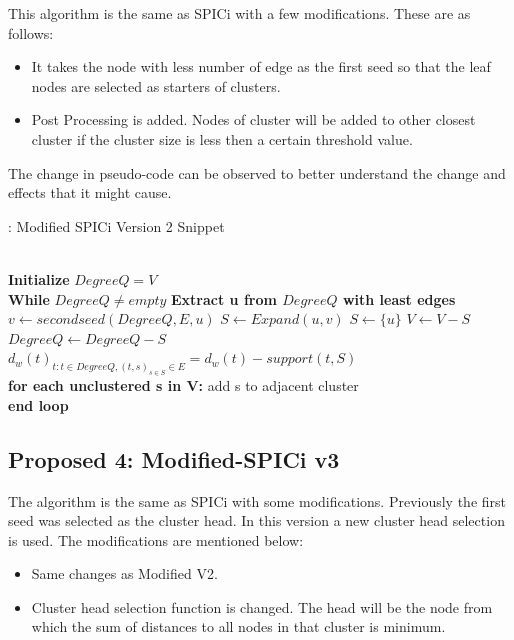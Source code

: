 \documentclass[8pt]{extarticle}
\begin{document}
	This algorithm is the same as SPICi with a few modifications. These are as follows:
	\begin{itemize}
		\item It takes the node with less number of edge as the first seed so that the leaf nodes are selected as starters of clusters.
		\item Post Processing is added. Nodes of cluster will be added to other closest cluster if the cluster size is less then a certain threshold value.
	\end{itemize}
	The change in pseudo-code can be observed to better understand the change and effects that it might cause.
	\begin{algorithm}
		\caption{: Modified SPICi Version 2 Snippet}\label{euclid}
		\begin{algorithmic}[1]
			 \\
			\textbf{Initialize} $DegreeQ = V$ \\
			\textbf{While} $DegreeQ \neq empty$
			\State \textbf{Extract u from $DegreeQ$ with least edges}
			\State $v \gets secondseed(DegreeQ,E,u)$
			 $S \gets Expand(u,v)$
			\EndIf
			\Else 
			\State $S \gets \{u\}$
			\EndIf
			\State $V \gets V - S $
			\State $Degree Q \gets Degree Q - S$
			\State $d_w(t)_{t:t\in DegreeQ,(t,s)_{s\in S}\in E} = d_w(t) - support(t,S)$
			\EndProcedure
			\\
				\textbf{for each unclustered s in V:}
					\State add s to adjacent cluster
					\EndIf \\
				\textbf{end loop}
			\EndProcedure
		\end{algorithmic}
	\end{algorithm}
	\subsection{Proposed 4: Modified-SPICi v3}
	
	The algorithm is the same as SPICi with some modifications. Previously the first seed was selected as the cluster head. In this version a new cluster head selection is used. The modifications are mentioned below:
	\begin{itemize}
		\item Same changes as Modified  V2.
		\item Cluster head selection function is changed. The head will be the node from which the sum of distances to all nodes in that cluster is minimum.
	\end{itemize}
\end{document}
